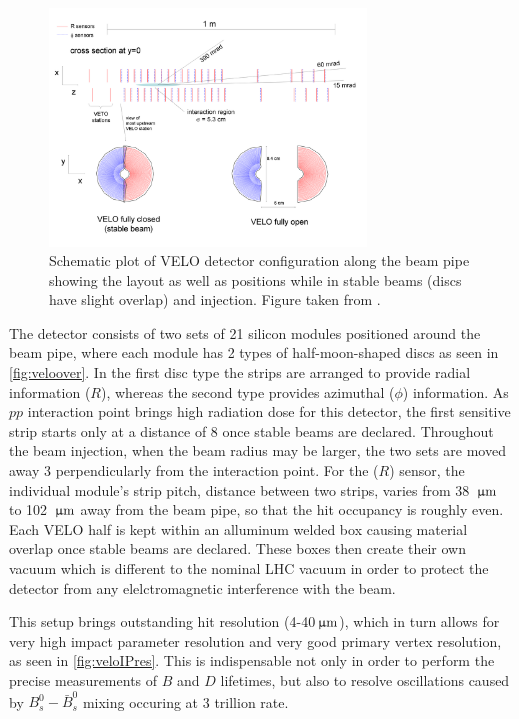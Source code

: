\begin{figure}[!h]
	\centering
	\includegraphics[width = 0.75\textwidth]{figs/detector/veloOverview.png}
	\caption{ Schematic plot of \Gls{VELO} detector configuration along the beam pipe showing the layout as well as positions while in stable beams (discs have slight overlap) and injection. Figure taken from \cite{det_paper}.}
	\label{fig:veloover}
\end{figure}

The detector consists of two sets of 21 silicon modules positioned around the beam pipe, where each module has 2 types of half-moon-shaped discs as seen in \autoref{fig:veloover}. In the first disc type the strips are arranged to provide radial information ($R$), whereas the second type provides azimuthal ($\phi$) information. As $pp$ interaction point brings high radiation dose for this detector, the first sensitive strip starts only at a distance of 8 \mm once stable beams are declared. Throughout the beam injection, when the beam radius may be larger, the two sets are moved away 3 \cm perpendicularly from the interaction point. For the ($R$) sensor, the individual module's strip pitch, distance between two strips, varies from 38 ${\,\upmu\rm m}$ to 102 ${\,\upmu\rm m}$ away from the beam pipe, so that the hit occupancy is roughly even. Each \Gls{VELO} half is kept within an alluminum welded box causing material overlap once stable beams are declared. These boxes then create their own vacuum which is different to the nominal LHC vacuum in order to protect the detector from any elelctromagnetic interference with the beam. 

This setup brings outstanding hit resolution (4-40${\,\upmu\rm m}$), which in turn allows for very high impact parameter resolution and very good primary vertex resolution, as seen in \autoref{fig:veloIPres}. This is indispensable not only in order to perform the precise measurements of $B$ and $D$ lifetimes, but also to resolve oscillations caused by $B^{0}_{s}-\bar{B}^{0}_{s}$ mixing occuring at 3 trillion \hz rate.

